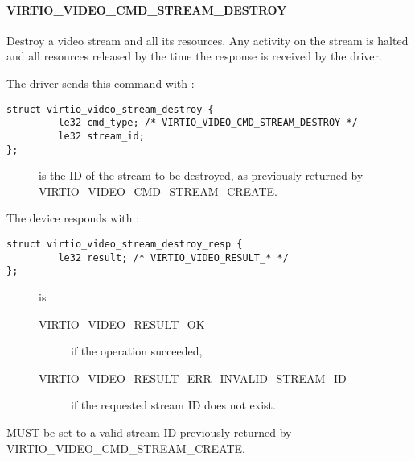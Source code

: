 \paragraph{VIRTIO_VIDEO_CMD_STREAM_DESTROY}\label{sec:Device Types / Video Device / Device Operation / Device Operation: Stream commands / VIRTIO_VIDEO_CMD_STREAM_DESTROY}

Destroy a video stream and all its resources. Any activity on the stream
is halted and all resources released by the time the response is
received by the driver.

The driver sends this command with
:

\begin{lstlisting}
struct virtio_video_stream_destroy {
         le32 cmd_type; /* VIRTIO_VIDEO_CMD_STREAM_DESTROY */
         le32 stream_id;
};
\end{lstlisting}

\begin{description}
\item[]
is the ID of the stream to be destroyed, as previously returned by
VIRTIO_VIDEO_CMD_STREAM_CREATE.
\end{description}

The device responds with
:

\begin{lstlisting}
struct virtio_video_stream_destroy_resp {
         le32 result; /* VIRTIO_VIDEO_RESULT_* */
};
\end{lstlisting}

\begin{description}
\item[]
is

\begin{description}
\item[VIRTIO_VIDEO_RESULT_OK]
if the operation succeeded,
\item[VIRTIO_VIDEO_RESULT_ERR_INVALID_STREAM_ID]
if the requested stream ID does not exist.
\end{description}
\end{description}


 MUST be set to a valid stream ID previously returned
by VIRTIO_VIDEO_CMD_STREAM_CREATE.

